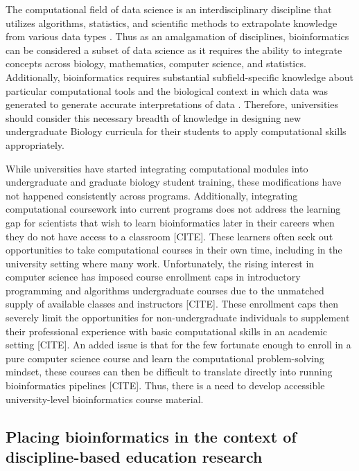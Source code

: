 The computational field of data science is an interdisciplinary discipline that utilizes algorithms, statistics, and scientific methods to extrapolate knowledge from various data types \cite{attwood2019,cao2017,getoor2019,stephens2015}. Thus as an amalgamation of disciplines, bioinformatics can be considered a subset of data science as it requires the ability to integrate concepts across biology, mathematics, computer science, and statistics. Additionally, bioinformatics requires substantial subfield-specific knowledge about particular computational tools and the biological context in which data was generated to generate accurate interpretations of data \cite{attwood2019,leonelli2019,marx2013,pal2020,rubinstein2014,tan2009}. Therefore, universities should consider this necessary breadth of knowledge in designing new undergraduate Biology curricula for their students to apply computational skills appropriately. 

While universities have started integrating computational modules into undergraduate and graduate biology student training, these modifications have not happened consistently across programs. Additionally, integrating computational coursework into current programs does not address the learning gap for scientists that wish to learn bioinformatics later in their careers when they do not have access to a classroom [CITE]. These learners often seek out opportunities to take computational courses in their own time, including in the university setting where many work. Unfortunately, the rising interest in computer science has imposed course enrollment caps in introductory programming and algorithms undergraduate courses due to the unmatched supply of available classes and instructors [CITE]. These enrollment caps then severely limit the opportunities for non-undergraduate individuals to supplement their professional experience with basic computational skills in an academic setting [CITE]. An added issue is that for the few fortunate enough to enroll in a pure computer science course and learn the computational problem-solving mindset, these courses can then be difficult to translate directly into running bioinformatics pipelines [CITE]. Thus, there is a need to develop accessible university-level bioinformatics course material.

\subsection{Placing bioinformatics in the context of discipline-based education research}


